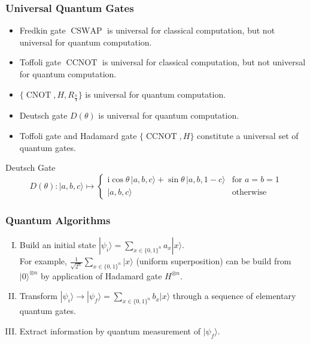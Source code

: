 \documentclass[UTF8,aspectratio=43,11pt,colorlinks,compress,openany]{beamer}%
\begin{document}
\begin{frame}\frametitle{Universal Quantum Gates}
	\begin{itemize}
		\item Fredkin gate $\operatorname{CSWAP}$ is universal for classical computation, but not universal for quantum computation.
		\item Toffoli gate $\operatorname{CCNOT}$ is universal for classical computation, but not universal for quantum computation.
		\item $\{\operatorname{CNOT},H,R_{\frac{\pi}{4}}\}$ is universal for quantum computation.
		\item Deutsch gate $D(\theta)$ is universal for quantum computation.
		\item Toffoli gate and Hadamard gate $\{\operatorname{CCNOT},H\}$ constitute a universal set of quantum gates.
	\end{itemize}
	\begin{block}{Deutsch Gate}
		\[D(\theta) : |a,b,c\rangle \mapsto \begin{cases} \mathrm{i}\cos\theta\,|a,b,c\rangle + \sin\theta\,|a,b,1-c\rangle & \mbox{for } a=b=1\\
		|a,b,c\rangle & \mbox{otherwise} \end{cases}\]
	\end{block}
\end{frame}

\begin{frame}\frametitle{Quantum Algorithms}
	\begin{enumerate}[I.]
		\item Build an initial state $|\psi_i\rangle=\sum\limits_{x\in\{0,1\}^n}a_x|x\rangle$.\\
		For example, $\frac{1}{\sqrt{2^n}}\sum\limits_{x\in\{0,1\}^n}|x\rangle$ (uniform superposition) can be build from $|0\rangle^{\otimes n}$ by application of Hadamard gate $H^{\otimes n}$.
		\item Transform $|\psi_i\rangle\to|\psi_f\rangle = \sum\limits_{x\in\{0,1\}^n} b_x|x\rangle$ through a sequence of elementary quantum gates.
		\item Extract information by quantum measurement of $|\psi_f\rangle$.
	\end{enumerate}
\end{frame}
\end{document}
